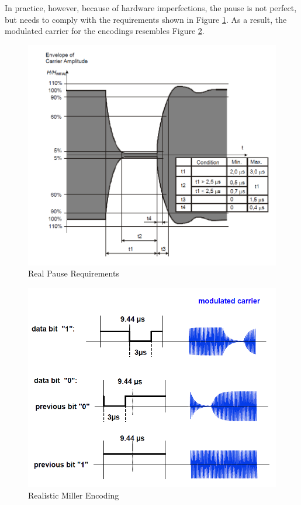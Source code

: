\documentclass[fleqn,10pt]{SelfArx} %
\begin{document}
In practice, however, because of hardware imperfections, the pause is not perfect, but needs to comply with the requirements shown in Figure \ref{fig:pause}. As a result, the modulated carrier for the encodings resembles Figure \ref{fig:miller2}.

\begin{figure}[h]
  \includegraphics[width=\linewidth]{img/pause}
  \caption{Real Pause Requirements \cite{iso144432}}
  \label{fig:pause}
\end{figure}


\begin{figure}[h]
  \includegraphics[width=\linewidth]{img/miller2}
  \caption{Realistic Miller Encoding \cite{mifare}}
  \label{fig:miller2}
\end{figure}
\end{document}
